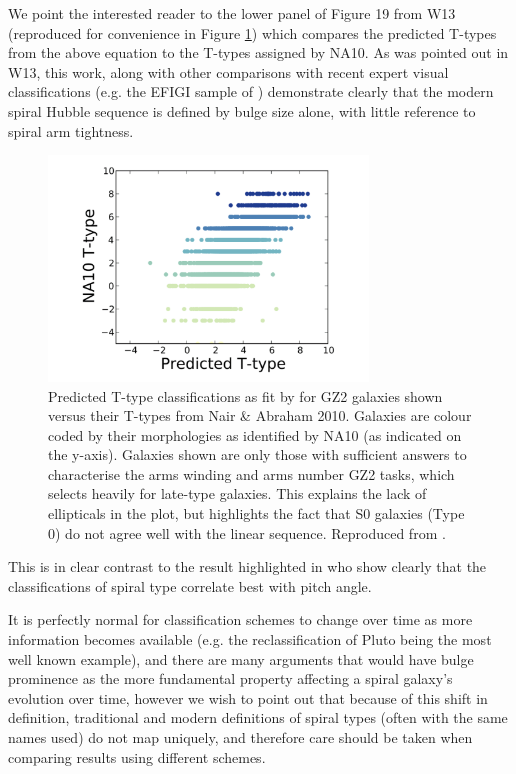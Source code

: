 \documentclass[usenatbib]{mn2e}
\begin{document}
We point the interested reader to the lower panel of Figure 19 from W13 (reproduced for convenience in Figure \ref{T-type}) which compares the predicted T-types from the above equation to the T-types assigned by NA10. As was pointed out in W13, this work, along with other comparisons with recent expert visual classifications (e.g. the EFIGI sample of \citealt{EFIGI}) demonstrate clearly that the modern spiral Hubble sequence is defined by bulge size alone, with little reference to spiral arm tightness. 

\begin{figure}
\includegraphics[height=60mm,angle=0]{T-typeW13.png}
\caption{Predicted T-type classifications as fit by \citet{Willett2013} for GZ2 galaxies shown versus their T-types from Nair \& Abraham 2010. Galaxies are colour coded by their morphologies as identified by NA10 (as indicated on the y-axis). Galaxies shown are only those with sufficient answers to characterise the arms winding and arms number GZ2 tasks, which selects heavily for late-type galaxies. This explains the lack of ellipticals in the plot, but highlights the fact that S0 galaxies (Type 0) do not agree well with the linear sequence. Reproduced from \citet{Willett2013}.  \label{T-type}}
\end{figure}

This is in clear contrast to the result highlighted in \citet{Kennicutt1981} who show clearly that the \citet{SandageTammann1981} classifications of spiral type correlate best with pitch angle. 

It is perfectly normal for classification schemes to change over time as more information becomes available (e.g. the reclassification of Pluto being the most well known example), and there are many arguments that would have bulge prominence as the more fundamental property affecting a spiral galaxy's evolution over time, however we wish to point out that because of this shift in definition, traditional and modern definitions of spiral types (often with the same names used) do not map uniquely, and therefore care should be taken when comparing results using different schemes.  
\end{document}
